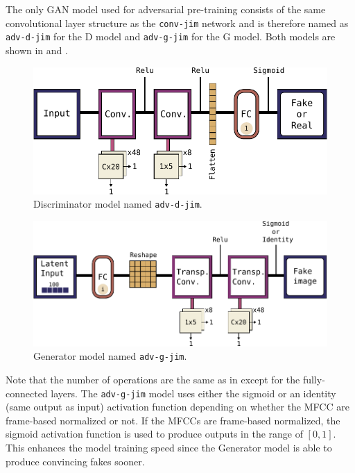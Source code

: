 The only GAN model used for adversarial pre-training consists of the same convolutional layer structure as the \texttt{conv-jim} network and is therefore named as \texttt{adv-d-jim} for the D model and \texttt{adv-g-jim} for the G model. 
Both models are shown in  and .
\begin{figure}[!ht]
  \centering
    \includegraphics[height=0.2\textwidth]{./4_nn/figs/nn_arch_adv_d_jim.pdf}
  \caption{Discriminator model named \texttt{adv-d-jim}.}
  \label{fig:nn_arch_adv_d_jim}
\end{figure}
\FloatBarrier
\noindent
\begin{figure}[!ht]
  \centering
    \includegraphics[height=0.23\textwidth]{./4_nn/figs/nn_arch_adv_g_jim.pdf}
  \caption{Generator model named \texttt{adv-g-jim}.}
  \label{fig:nn_arch_adv_g_jim}
\end{figure}
\FloatBarrier
\noindent
Note that the number of operations are the same as in  except for the fully-connected layers.
The \texttt{adv-g-jim} model uses either the sigmoid or an identity (same output as input) activation function depending on whether the MFCC are frame-based normalized or not.
If the MFCCs are frame-based normalized, the sigmoid activation function is used to produce outputs in the range of $[0, 1]$.
This enhances the model training speed since the Generator model is able to produce convincing fakes sooner.



